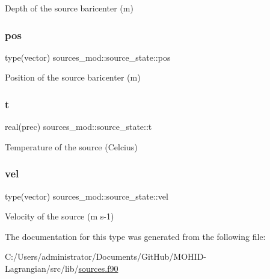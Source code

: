 Depth of the source baricenter (m) 

\mbox{\label{structsources__mod_1_1source__state_a8dacf7040158bb5214f66476bf1a1c3d}} 
\subsubsection{\texorpdfstring{pos}{pos}}
{\footnotesize\ttfamily type(vector) sources\+\_\+mod\+::source\+\_\+state\+::pos\hspace{0.3cm}{\ttfamily [private]}}



Position of the source baricenter (m) 

\mbox{\label{structsources__mod_1_1source__state_a7d51970a13f9664bbaf9d09afea0b363}} 
\subsubsection{\texorpdfstring{t}{t}}
{\footnotesize\ttfamily real(prec) sources\+\_\+mod\+::source\+\_\+state\+::t\hspace{0.3cm}{\ttfamily [private]}}



Temperature of the source (Celcius) 

\mbox{\label{structsources__mod_1_1source__state_a52c6f025eb262a7a07b2a8b4ec7065ac}} 
\subsubsection{\texorpdfstring{vel}{vel}}
{\footnotesize\ttfamily type(vector) sources\+\_\+mod\+::source\+\_\+state\+::vel\hspace{0.3cm}{\ttfamily [private]}}



Velocity of the source (m s-\/1) 



The documentation for this type was generated from the following file\+:\begin{DoxyCompactItemize}
\item 
C\+:/\+Users/administrator/\+Documents/\+Git\+Hub/\+M\+O\+H\+I\+D-\/\+Lagrangian/src/lib/\hyperlink{sources_8f90}{sources.\+f90}\end{DoxyCompactItemize}
